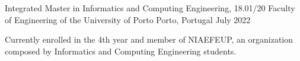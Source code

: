 
\begin{cventries}
  \cventry
    {Integrated Master in Informatics and Computing Engineering, 18.01/20} %
    {Faculty of Engineering of the University of Porto} %
    {Porto, Portugal} %
    {July 2022} %
    {
      \begin{cvitems}
        \item {Currently enrolled in the 4th year and member of NIAEFEUP, an organization composed by Informatics and Computing Engineering students.}
      \end{cvitems}
    }
\end{cventries}
